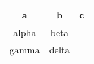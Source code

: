 \begin{table}
\centering
\begin{tabular}{ccc}
\toprule
a 	 & b 	 & c \\
\midrule
alpha 	 & beta 	 &  \\
gamma 	 & delta 	 &  \\
\bottomrule
\end{tabular}
\end{table}